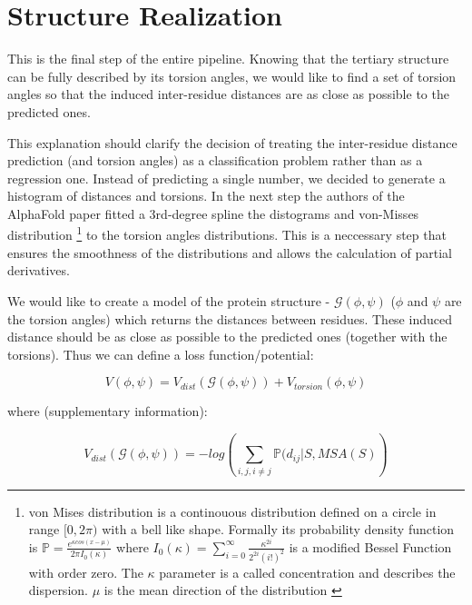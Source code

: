 \section{Structure Realization}
    
This is the final step of the entire pipeline. 
Knowing that the tertiary structure can be fully described by its torsion angles, we would like to find a set of torsion angles so that the induced inter-residue distances are as close as possible to the predicted ones. 
        
This explanation should clarify the decision of treating the inter-residue distance prediction (and torsion angles) as a classification problem rather than as a regression one. 
Instead of predicting a single number, we decided to generate a histogram of distances and torsions. 
In the next step the authors of the AlphaFold paper fitted a 3rd-degree spline the distograms and von-Misses distribution \footnote{von Mises distribution is a continouous distribution defined on a circle in range $[0, 2\pi)$ with a bell like shape. Formally its probability density function is $\mathds{P} = \frac{e^{\kappa cos(x - \mu)}}{2\pi I_0(\kappa)}$ where $I_0(\kappa) = \sum_{i=0}^\infty \frac{\kappa^{2i}}{2^{2i}(i!)^2}$ is a modified Bessel Function with order zero. 
The $\kappa$ parameter is a called concentration and describes the dispersion. 
$\mu$ is the mean direction of the distribution \cite{vonmises}} to the torsion angles distributions. 
This is a neccessary step that ensures the smoothness of the distributions and allows the calculation of partial derivatives.
        
We would like to create a model of the protein structure - $\mathcal{G}(\phi, \psi)$ ($\phi$ and $\psi$ are the torsion angles) which returns the distances between residues. 
These induced distance should be as close as possible to the predicted ones (together with the torsions). 
Thus we can define a loss function/potential:
        
\begin{equation}
    V(\phi, \psi) = V_{dist}(\mathcal{G}(\phi, \psi)) + V_{torsion}(\phi, \psi)
\end{equation}
        
where \cite{alphafold}(supplementary information):
        
\begin{equation}
     V_{dist}(\mathcal{G}(\phi, \psi)) = -log\left(\sum_{i, j, i \neq j} \mathds{P} (d_{ij} | S, MSA(S)\right)
\end{equation}

